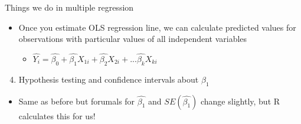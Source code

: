 \documentclass[8pt,ignorenonframetext,dvipsnames]{beamer}
\providecommand{\tightlist}{%
  \setlength{\itemsep}{0pt}\setlength{\parskip}{0pt}}
\let\olditem\item
\renewcommand{\item}{%
  \olditem\vspace{4pt}
}
\begin{document}
\begin{frame}{Things we do in multiple regression}
\begin{itemize}
\tightlist
\item
  Once you estimate OLS regression line, we can calculate predicted
  values for observations with particular values of all independent
  variables

  \begin{itemize}
  \tightlist
  \item
    \(\hat{Y_i} = \hat{\beta_0} + \hat{\beta_1} X_{1i} + \hat{\beta_2} X_{2i} + ... \hat{\beta_k} X_{ki}\)
  \end{itemize}
\end{itemize}

\begin{enumerate}
\setcounter{enumi}{3}
\tightlist
\item
  Hypothesis testing and confidence intervals about \(\beta_1\)
\end{enumerate}

\begin{itemize}
\tightlist
\item
  Same as before but forumals for \(\hat{\beta_1}\) and
  \(SE(\hat{\beta_1})\) change slightly, but R calculates this for us!
\end{itemize}

\end{frame}
\end{document}
